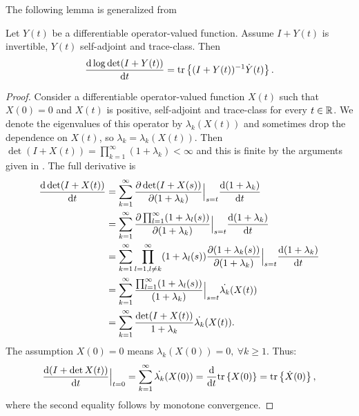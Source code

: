 \documentclass{siamonline220329}
\begin{document}
The following lemma is generalized from \cite[Chapter 9, Theorem 4,
p. 127]{Lax07}
\begin{lemma}\label{lemma:lax}
  Let $Y(t)$ be a differentiable operator-valued function. Assume 
  $I+Y(t)$ is invertible, $Y(t)$ self-adjoint and trace-class. Then
  \begin{equation*}
    \frac{\text{\textup{d}} \log \det (I+Y(t))}{\text{\textup{d}} t} = \textup{tr}\left \{(I+Y(t))^{-1} \dot{Y}(t) \right \}.
  \end{equation*}
\end{lemma}

\begin{proof}
  Consider a differentiable operator-valued function $X(t)$ such that
  $X(0) = 0$ and $X(t)$ is positive, self-adjoint and trace-class for
  every $t\in \mathbb{R}$. We denote the eigenvalues of this operator by
  $\lambda_k(X(t))$ and sometimes drop the dependence on $X(t)$, so
  $\lambda_k = \lambda_k(X(t))$.  Then $\det (I+X(t))
  = \prod_{k=1}^{\infty} (1+\lambda_k) < \infty$ and this is finite by
  the arguments given in \cite{AlexanderianGloorGhattas14}. The full
  derivative is \begin{align*} \frac{\text{\textup{d}} \det (I+X(t))}{\text{\textup{d}} t}
    &= \sum_{k=1}^{\infty} 
    \frac{\partial \det (I+X(s))}{\partial (1+\lambda_k)}\Big |_{s=t}
    \frac{\text{\textup{d}} (1+\lambda_k)}{\text{\textup{d}} t} \\
    &= \sum_{k=1}^{\infty} \frac{\partial \prod_{l=1}^{\infty}
      (1+\lambda_l(s))}{\partial (1+\lambda_k)}\Big |_{s=t}
    \frac{\text{\textup{d}} (1+\lambda_k)}{\text{\textup{d}} t} \\
    &= \sum_{k=1}^{\infty} \prod_{l=1, l\neq k}^{\infty}
      (1+\lambda_l(s)) \frac{\partial (1+\lambda_k(s))}{\partial (1+\lambda_k)}\Big |_{s=t}
    \frac{\text{\textup{d}} (1+\lambda_k)}{\text{\textup{d}} t} \\
    &= \sum_{k=1}^{\infty} \frac{\prod_{l=1}^{\infty}
      (1+\lambda_l(s))}{(1+\lambda_k)}\Big |_{s=t}
    \dot{\lambda_k}(X(t)) \\
    &= \sum_{k=1}^{\infty} \frac{\det (I+X(t))}{1 +\lambda_k} \dot{\lambda_k}(X(t)).
  \end{align*}
  The assumption $X(0) = 0$ means $\lambda_k(X(0)) = 0,\ \forall k \geq 1$. Thus:
  \begin{align*}
    \frac{\text{\textup{d}} (I+\det X(t))}{\text{\textup{d}} t}\Big |_{t=0} 
    = \sum_{k=1}^{\infty} \dot{\lambda_k}(X(0)) 
    = \frac{\text{\textup{d}} }{\text{\textup{d}} t}\textup{tr}\left \{X(0) \right \}
    = \textup{tr}\left \{\dot{X}(0) \right \},
  \end{align*}
  where the second equality follows by monotone convergence. 

\end{proof}
\end{document}

